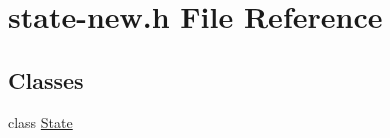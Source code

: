 \hypertarget{state-new_8h}{
\section{state-new.h File Reference}
\label{state-new_8h}
}
\subsection*{Classes}
\begin{CompactItemize}
\item 
class \hyperlink{classState}{State}
\end{CompactItemize}
